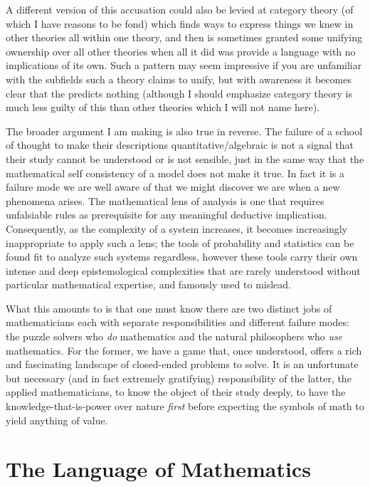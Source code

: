 \documentclass[11pt]{article}
\begin{document}
A different version of this accusation could also be levied at category theory (of which I have reasons to be fond) which finds ways to express things we knew in other theories all within one theory, and then is sometimes granted some unifying ownership over all other theories when all it did was provide a language with no implications of its own. Such a pattern may seem impressive if you are unfamiliar with the subfields such a theory claims to unify, but with awareness it becomes clear that the  predicts nothing (although I should emphasize category theory is much less guilty of this than other theories which I will not name here).

The broader argument I am making is also true in reverse. The failure of a school of thought to make their descriptions quantitative/algebraic is not a signal that their study cannot be understood or is not sensible, just in the same way that the mathematical self consistency of a model does not make it true. In fact it is a failure mode we are well aware of that we might discover we are  when a new phenomena arises. The mathematical lens of analysis is one that requires unfalsiable rules as prerequisite for any meaningful deductive implication. Consequently, as the complexity of a system increases, it becomes increasingly inappropriate to apply such a lens; the tools of probability and statistics can be found fit to analyze such systems regardless, however these tools carry their own intense and deep epistemological complexities that are rarely understood without particular mathematical expertise, and famously used to mislead.

What this amounts to is that one must know there are two distinct jobs of mathematicians each with separate responsibilities and different failure modes: the puzzle solvers who \emph{do} mathematics and the natural philosophers who \emph{use} mathematics. For the former, we have a game that, once understood, offers a rich and fascinating landscape of closed-ended problems to solve. It is an unfortunate but necessary (and in fact extremely gratifying) responsibility of the latter, the applied mathematicians, to know the object of their study deeply, to have the knowledge-that-is-power over nature \emph{first} before expecting the symbols of math to yield anything of value. 

\section{The Language of Mathematics}
\end{document}
